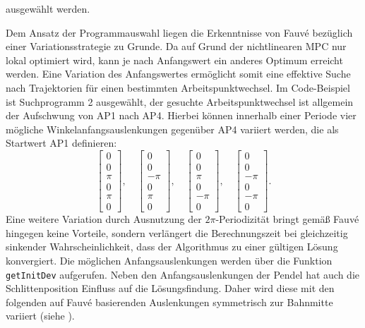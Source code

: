 ausgewählt werden.

Dem Ansatz der Programmauswahl liegen die Erkenntnisse von Fauvé \cite{fauve} bezüglich einer Variationsstrategie zu Grunde. Da auf Grund der nichtlinearen MPC nur lokal optimiert wird, kann je nach Anfangswert ein anderes Optimum erreicht werden. Eine Variation des Anfangswertes ermöglicht somit eine effektive Suche nach Trajektorien für einen bestimmten Arbeitspunktwechsel. Im Code-Beispiel ist Suchprogramm 2 ausgewählt, der gesuchte Arbeitspunktwechsel ist allgemein der Aufschwung von AP1 nach AP4. Hierbei können innerhalb einer Periode vier mögliche Winkelanfangsauslenkungen gegenüber AP4 variiert werden, die als Startwert AP1 definieren:
\[
	\begin{bmatrix}
		0 \\ 0 \\ \pi \\ 0 \\ \pi \\ 0
	\end{bmatrix}, \quad
	\begin{bmatrix}
		0 \\ 0 \\ -\pi \\ 0 \\ \pi \\ 0
	\end{bmatrix}, \quad
	\begin{bmatrix}
		0 \\ 0 \\ \pi \\ 0 \\ -\pi \\ 0
	\end{bmatrix}, \quad
	\begin{bmatrix}
		0 \\ 0 \\ -\pi \\ 0 \\ -\pi \\ 0
	\end{bmatrix} .
\]
Eine weitere Variation durch Ausnutzung der $2\pi$-Periodizität bringt gemäß Fauvé \cite{fauve} hingegen keine Vorteile, sondern verlängert die Berechnungszeit bei gleichzeitig sinkender Wahrscheinlichkeit, dass der Algorithmus zu einer gültigen Lösung konvergiert. Die möglichen Anfangsauslenkungen werden über die Funktion \texttt{getInitDev} aufgerufen.
Neben den Anfangsauslenkungen der Pendel hat auch die Schlittenposition Einfluss auf die Lösungsfindung. Daher wird diese mit den folgenden auf Fauvé \cite{fauve} basierenden Auslenkungen symmetrisch zur Bahnmitte variiert (siehe ).
